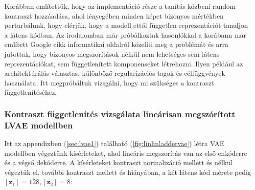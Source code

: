 \documentclass[12pt, english]{article}
\begin{document}
\vspace{5mm}

\par Korábban említettük, hogy az implementáció része a tanítás közbeni random kontraszt hozzáadása, ahol lényegében minden képet bizonyos mértékben perturbálunk, hogy elérjük, hogy a modell ettől független reprezentációt tanuljon a látens kódban. Az irodalomban már próbálkoztak hasonlókkal a korábann már említett Google cikk \cite{locatello2018challenging} informatikai oldalról közelíti meg a problémát és arra jutottak, hogy bizonyos megszorítások nélkül nem lehetséges sem látens reprezentációkat, sem függetlenített komponenseket létrehozni. Ilyen például az architektúrálás választas, különböző regularizációs tagok és célfüggvények használata. Itt megpróbáltuk vizsgálni, hogy mi szükséges a kontraszt függetlenítéséhez.

\vspace{4mm}

\subsubsection{Kontraszt függetlenítés vizsgálata lineárisan megszórított LVAE modellben}

\vspace{4mm}

\par Itt az appendixben (\ref{sec:lvae1}) található (\ref{fig:linlinladdervae}) létra VAE modellben végeztünk kísérleteket, ahol lineáris megszorítás van az első enkóderre és a végső dekóderre. A kísérleteket kontraszt normalizáció mellett és nélkül végeztük el, további kontraszt mellett és hiányában, a két látens kód mérete pedig $[\bm{z}_{1}] = 128, [\bm{z}_{2}] = 8$:

\vspace{4mm}
\end{document}
